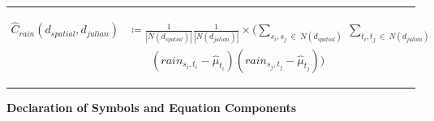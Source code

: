 \documentclass[
  12pt,
]{article}
\begin{document}
\rule{1\linewidth}{0.5pt}

\begin{equation}\label{eq:empirical_spatio-temporal_covariance_function_equation}
\begin{aligned}
\widehat{C}_{rain}(d_{spatial},d_{julian}) &\coloneqq \frac{1}{|N(d_{spatial})|}\frac{1}{|N(d_{julian})|}\times \Bigg(\sum_{s_{i},s_{j}\:\in\:N(d_{spatial})}\:\sum_{t_{i},t_{j}\:\in\:N(d_{julian})} \\ &\qquad\left(rain_{s_{i},t_{i}} - \widehat{\mu}_{t_{i}}\right)\left(rain_{s_{j},t_{j}} - \widehat{\mu}_{t_{j}}\right)\Bigg)
\end{aligned}
\end{equation}

\citet{Cressie.2011} \textbar{} \citet{Wikle.2019} \textbar{}
\citet{Auer.2020}

\rule{1\linewidth}{0.5pt}

\begin{center}
\textbf{Declaration of Symbols and Equation Components}
\end{center}
\end{document}
